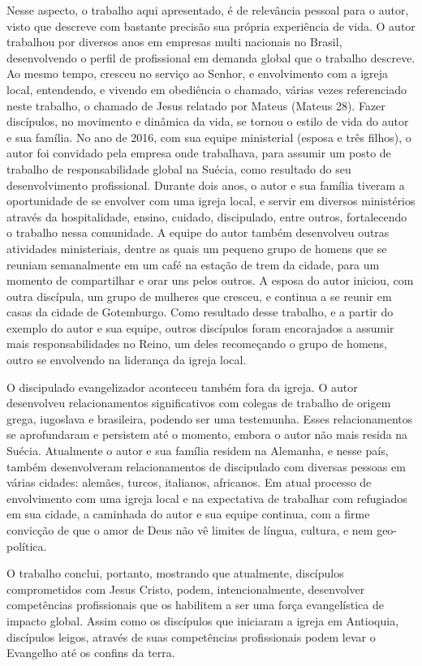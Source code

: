 \documentclass[12pt,openright,oneside,a4paper]{abntex2}
\begin{document}
Nesse aspecto, o trabalho aqui apresentado, é de relevância pessoal para o autor, visto que descreve com bastante precisão sua própria experiência de vida. O autor trabalhou por diversos anos em empresas multi nacionais no Brasil, desenvolvendo o perfil de profissional em demanda global que o trabalho descreve. Ao mesmo tempo, cresceu no serviço ao Senhor, e envolvimento com a igreja local, entendendo, e vivendo em obediência o chamado, várias vezes referenciado neste trabalho, o chamado de Jesus relatado por Mateus (Mateus 28). Fazer discípulos, no movimento e dinâmica da vida, se tornou o estilo de vida do autor e sua família. No ano de 2016, com sua equipe ministerial (esposa e três filhos), o autor foi convidado pela empresa onde trabalhava, para assumir um posto de trabalho de responsabilidade global na Suécia, como resultado do seu desenvolvimento profissional. Durante dois anos, o autor e sua família tiveram a oportunidade de se envolver com uma igreja local, e servir em diversos ministérios através da hospitalidade, ensino, cuidado, discipulado, entre outros, fortalecendo o trabalho nessa comunidade. A equipe do autor também desenvolveu outras atividades ministeriais, dentre as quais um pequeno grupo de homens que se reuniam semanalmente em um café na estação de trem da cidade, para um momento de compartilhar e orar uns pelos outros. A esposa do autor iniciou, com outra discípula, um grupo de mulheres que cresceu, e continua a se reunir em casas da cidade de Gotemburgo. Como resultado desse trabalho, e a partir do exemplo do autor e sua equipe, outros discípulos foram encorajados a assumir mais responsabilidades no Reino, um deles recomeçando o grupo de homens, outro se envolvendo na liderança da igreja local. 

O discipulado evangelizador aconteceu também fora da igreja. O autor desenvolveu relacionamentos significativos com colegas de trabalho de origem grega, iugoslava e brasileira, podendo ser uma testemunha. Esses relacionamentos se aprofundaram e persistem até o momento, embora o autor não mais resida na Suécia. Atualmente o autor e sua família residem na Alemanha, e nesse país, também desenvolveram relacionamentos de discipulado com diversas pessoas em várias cidades: alemães, turcos, italianos, africanos. Em atual processo de envolvimento com uma igreja local e na expectativa de trabalhar com refugiados em sua cidade, a caminhada do autor e sua equipe continua, com a firme convicção de que o amor de Deus não vê limites de língua, cultura, e nem geo-política.

O trabalho conclui, portanto, mostrando que atualmente, discípulos comprometidos com Jesus Cristo, podem, intencionalmente, desenvolver competências profissionais que os habilitem a ser uma força evangelística de impacto global. Assim como os discípulos que iniciaram a igreja em Antioquia, discípulos leigos, através de suas competências profissionais podem levar o Evangelho até os confins da terra.


\end{document}
